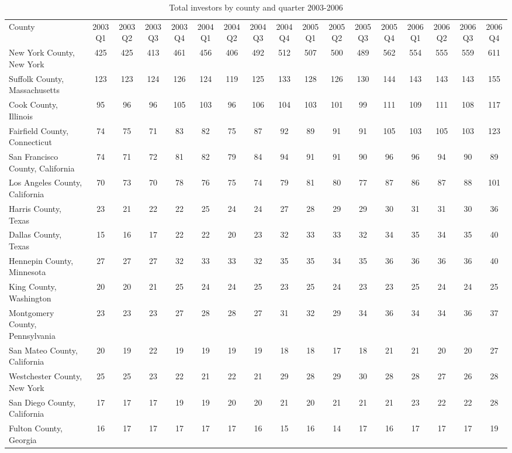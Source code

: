 \begin{landscape}
	\begin{longtable}{lcccccccccccccccc}
	\setlength{\tabcolsep}{8pt}
		\caption[Total Investors by County and Quarter 2003-2006]{Total investors by county and quarter 2003-2006}
	County &2003Q1 &2003Q2 &2003Q3 &2003Q4 &2004Q1 &2004Q2 &2004Q3 &2004Q4 &2005Q1 & 2005Q2 &2005Q3 &2005Q4 &2006Q1 &2006Q2 &2006Q3 & 2006Q4 \\
		New York County, New York & 425 & 425 & 413 & 461 & 456 & 406 & 492 & 512 & 507 & 500 & 489 & 562 & 554 & 555 & 559 & 611 \\
		Suffolk County, Massachusetts & 123 & 123 & 124 & 126 & 124 & 119 & 125 & 133 & 128 & 126 & 130 & 144 & 143 & 143 & 143 & 155 \\
		Cook County, Illinois & 95 & 96 & 96 & 105 & 103 & 96 & 106 & 104 & 103 & 101 & 99 & 111 & 109 & 111 & 108 & 117 \\
		Fairfield County, Connecticut & 74 & 75 & 71 & 83 & 82 & 75 & 87 & 92 & 89 & 91 & 91 & 105 & 103 & 105 & 103 & 123 \\
		San Francisco County, California & 74 & 71 & 72 & 81 & 82 & 79 & 84 & 94 & 91 & 91 & 90 & 96 & 96 & 94 & 90 & 89 \\
		Los Angeles County, California & 70 & 73 & 70 & 78 & 76 & 75 & 74 & 79 & 81 & 80 & 77 & 87 & 86 & 87 & 88 & 101 \\
		Harris County, Texas & 23 & 21 & 22 & 22 & 25 & 24 & 24 & 27 & 28 & 29 & 29 & 30 & 31 & 31 & 30 & 36 \\
		Dallas County, Texas & 15 & 16 & 17 & 22 & 22 & 20 & 23 & 32 & 33 & 33 & 32 & 34 & 35 & 34 & 35 & 40 \\
		Hennepin County, Minnesota & 27 & 27 & 27 & 32 & 33 & 33 & 32 & 35 & 35 & 34 & 35 & 36 & 36 & 36 & 36 & 40 \\
		King County, Washington & 20 & 20 & 21 & 25 & 24 & 24 & 25 & 23 & 25 & 24 & 23 & 23 & 25 & 24 & 24 & 25 \\
		Montgomery County, Pennsylvania & 23 & 23 & 23 & 27 & 28 & 28 & 27 & 31 & 32 & 29 & 34 & 36 & 34 & 34 & 36 & 37 \\
		San Mateo County, California & 20 & 19 & 22 & 19 & 19 & 19 & 19 & 18 & 18 & 17 & 18 & 21 & 21 & 20 & 20 & 27 \\
		Westchester County, New York & 25 & 25 & 23 & 22 & 21 & 22 & 21 & 29 & 28 & 29 & 30 & 28 & 28 & 27 & 26 & 28 \\
		San Diego County, California & 17 & 17 & 17 & 19 & 19 & 20 & 20 & 21 & 20 & 21 & 21 & 21 & 23 & 22 & 22 & 28 \\
		Fulton County, Georgia & 16 & 17 & 17 & 17 & 17 & 17 & 16 & 15 & 16 & 14 & 17 & 16 & 17 & 17 & 17 & 19 \\

\end{longtable}
\end{landscape}
